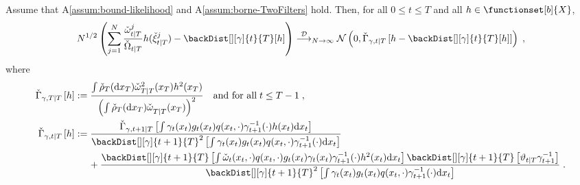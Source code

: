 \begin{prop}
\label{prop:CLT-backward}
Assume that A\ref{assum:bound-likelihood} and A\ref{assum:borne-TwoFilters} hold. Then, for all $0\le t\le T$ and all $h \in \functionset[b]{X}$,
\[
N^{1/2} \left(\sum_{j=1}^N \frac{\ebackwght{t}{T}{j}}{\backsumwght{t}{T}} h(\ebackpart{t}{T}{j})- \backDist[][\gamma]{t}{T}[h]\right) \dlim_{N \to \infty} \mathcal{N}\left(0,\backasymVar[\gamma]{t}{T}{h-\backDist[][\gamma]{t}{T}[h]}\right)\eqsp,
\]
where 
\begin{align*}
\backasymVar[\gamma]{T}{T}{h} &\eqdef \frac{ \int \ebackinit_T(\rmd x_T)\ebackwght{T}{T}{2}(x_T)h^2(x_T)}{\left( \int \ebackinit_T(\rmd x_T)\ebackwght{T}{T}{}(x_T)\right)^{2}}\quad\mbox{and for all\;} t\le T-1\eqsp,\\
\backasymVar[\gamma]{t}{T}{h} &\eqdef \frac{\backasymVar[\gamma]{t+1}{T}{\int\gamma_t(x_t)g_t(x_t)q(x_t,\cdot)\gamma^{-1}_{t+1}(\cdot)h(x_t)\rmd x_t}}{\backDist[][\gamma]{t+1}{T}^2\left[\int\gamma_t(x_t)g_t(x_t)q(x_t,\cdot)\gamma^{-1}_{t+1}(\cdot)\rmd x_t\right]}\\
&\hspace{.5cm}+\frac{\backDist[][\gamma]{t+1}{T}\left[\int\backweight_t(x_t,\cdot)q(x_t,\cdot)g_t(x_t)\gamma_t(x_t)\gamma^{-1}_{t+1}(\cdot)h^2(x_t)\rmd x_t\right]\backDist[][\gamma]{t+1}{T}\left[\adjfunc{t}{T}{}\gamma_{t+1}^{-1}\right]}{\backDist[][\gamma]{t+1}{T}^2\left[\int\gamma_t(x_t)g_t(x_t)q(x_t,\cdot)\gamma^{-1}_{t+1}(\cdot)\rmd x_t\right]}\eqsp.
\end{align*}
\end{prop}